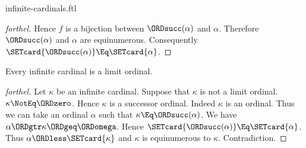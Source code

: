 \documentclass{stex}
\begin{document}
\begin{smodule}{infinite-cardinals.ftl}
\begin{proof}[forthel]
  Hence $f$ is a bijection between $\ORDsucc(\alpha)$ and $\alpha$.
  Therefore $\ORDsucc(\alpha)$ and $\alpha$ are equinumerous.
  Consequently $\SETcard{\ORDsucc(\alpha)} \Eq \SETcard{\alpha}$.
\end{proof}

\begin{proposition}[forthel]
  Every infinite cardinal is a limit ordinal.
\end{proposition}
\begin{proof}[forthel]
  Let $\kappa$ be an infinite cardinal.
  Suppose that $\kappa$ is not a limit ordinal.
  $\kappa \NotEq \ORDzero$.
  Hence $\kappa$ is a successor ordinal.
  Indeed $\kappa$ is an ordinal.
  Thus we can take an ordinal $\alpha$ such that $\kappa \Eq \ORDsucc(\alpha)$.
  We have $\alpha \ORDgtr \kappa \ORDgeq \ORDomega$.
  Hence $\SETcard{\ORDsucc(\alpha)} \Eq \SETcard{\alpha}$.
  Thus $\alpha \ORDless \SETcard{\kappa}$ and $\kappa$ is equinumerous to $\kappa$.
  Contradiction.
\end{proof}
\end{smodule}
\end{document}
